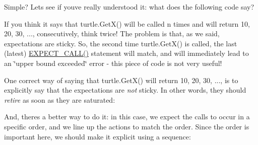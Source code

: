 Simple? Let\textquotesingle{}s see if you\textquotesingle{}ve really understood it\+: what does the following code say?


\begin{DoxyCode}{0}
\DoxyCodeLine{\}}
\end{DoxyCode}


If you think it says that {\ttfamily turtle.\+Get\+X()} will be called {\ttfamily n} times and will return 10, 20, 30, ..., consecutively, think twice! The problem is that, as we said, expectations are sticky. So, the second time {\ttfamily turtle.\+Get\+X()} is called, the last (latest) {\ttfamily \mbox{\hyperlink{gmock-spec-builders_8h_a535a6156de72c1a2e25a127e38ee5232}{E\+X\+P\+E\+C\+T\+\_\+\+C\+A\+L\+L()}}} statement will match, and will immediately lead to an \char`\"{}upper bound exceeded\char`\"{} error -\/ this piece of code is not very useful!

One correct way of saying that {\ttfamily turtle.\+Get\+X()} will return 10, 20, 30, ..., is to explicitly say that the expectations are {\itshape not} sticky. In other words, they should {\itshape retire} as soon as they are saturated\+:


\begin{DoxyCode}{0}
\DoxyCodeLine{\}}
\end{DoxyCode}


And, there\textquotesingle{}s a better way to do it\+: in this case, we expect the calls to occur in a specific order, and we line up the actions to match the order. Since the order is important here, we should make it explicit using a sequence\+:


\begin{DoxyCode}{0}
\DoxyCodeLine{\{}
\DoxyCodeLine{}
\DoxyCodeLine{  \}}
\DoxyCodeLine{\}}
\end{DoxyCode}



